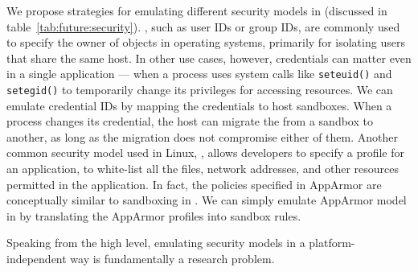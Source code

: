 We propose strategies for emulating different security models in \liboses{}  (discussed in table~\ref{tab:future:security}).
, such as user IDs or group IDs,
are commonly used to specify the owner of objects in operating systems,
primarily for
isolating users that share the same  host.
In other use cases, however, credentials can matter even in a single application
--- when a process uses system calls like {\tt seteuid()} and {\tt setegid()}
to temporarily change its privileges for accessing resources.
We can emulate credential IDs by mapping the credentials to host sandboxes.
When a process changes its credential,
the host can migrate the \picoproc{} from a sandbox to another,
as long as the migration
does not compromise either of them.
Another common security model used in Linux, , 
allows developers to specify a profile for an application,
to white-list
all the files, network addresses, and other resources
permitted in the application.
In fact, the policies specified in AppArmor are conceptually similar
to sandboxing in \graphene{}.
We can simply emulate AppArmor model in \graphene{} by translating the AppArmor profiles into sandbox rules.

Speaking from the high level,
emulating security models in a platform-independent way is fundamentally a research problem. 








%


